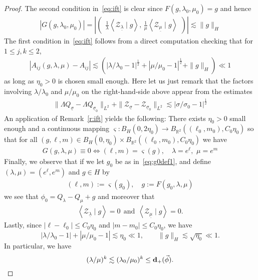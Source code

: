\documentclass[10pt,reqno]{amsart}
\newcommand{\ZZ}{\mathcal{Z}}
\newcommand{\R}{\mathbb{R}}
\newcommand{\la}{\lambda}
\newcommand{\s}{\sigma}
\newcommand{\si}{\varsigma}
\newcommand{\La}{\Lambda}
\newcommand{\U}{\underline}
\newcommand{\ang}[1]{\left\langle{#1}\right\rangle}
\newcommand{\abs}[1]{\left\lvert{#1}\right\rvert}
\newcommand{\EQ}[1]{\begin{equation}\begin{split} #1 \end{split}\end{equation}}
\newcommand{\pmat}[1]{\begin{pmatrix} #1 \end{pmatrix}}
\numberwithin{equation}{section}
\theoremstyle{remark}
\newcommand{\mand}{{\ \ \text{and} \ \  }}
\newcommand{\ula}{\underline{\lambda}}
\newcommand{\umu}{\underline{\mu}}
\newcommand{\0}{\emptyset}
\newcommand{\bfd}{{\bf d}}
\begin{document}
\begin{proof}
The second condition in~\eqref{eq:ift} is clear since $F(g, \la_0, \mu_0) = g$ and hence
\EQ{
| G( g, \la_0, \mu_0)| = \abs{  \pmat{ \frac{1}{\la} \ang{ \ZZ_{\ula} \mid g} , \, \frac{1}{\mu} \ang{ \ZZ_{\U\mu}  \mid g} }} \lesssim   \| g\|_H
}
The first condition in~\eqref{eq:ift} follows from a direct computation checking that for $1 \le j, k \le2$, 
\EQ{
\abs{  A_{ij}(g, \la, \mu) - A_{ij} } \lesssim ( \abs{ \la/\la_0 - 1}^{\frac{1}{2}} + \abs{\mu/ \mu_0 -1}^{\frac{1}{2}} + \|g \|_H)   \ll 1 
} 
as long as $\eta_0>0$ is chosen small enough. Here let us just remark that the factors involving $\la/\la_0$ and $\mu/\mu_0$ on the right-hand-side above appear from the estimates 
\EQ{
 \| \La Q_{\U \s} - \La Q_{\U \s_0} \|_{L^2} + \| \ZZ_{\U \s} - \ZZ_{\U \s_0} \|_{L^2} \lesssim \abs{\s/ \s_0 - 1}^{\frac{1}{2}}
}
An application of Remark~\ref{r:ift}  yields the following: There exists $\eta_0>0$ small enough %
 and a continuous mapping $\si: B_{H}(0, 2\eta_0) \to B_{\R^2}((\ell_0, m_0), C_0 \eta_0)$
 so that for all $(g, \ell, m) \in B_{H}(0, \eta_0) \times B_{\R^2}( (\ell_0, m_0), C_0 \eta_0)$ we have 
\EQ{
G( g, \la, \mu) \equiv 0 \Longleftrightarrow  (\ell, m) = \si(g), \quad \la = e^\ell, \, \, \mu = e^m
}
Finally, we observe that if we let $ g_0$ be as in~\eqref{eq:g0def1}, and define $(\la, \mu) = (e^{\ell}, e^{m})$ and $ g \in H$ by 
\EQ{
(\ell, m):=  \si( g_0), \quad g:= F(  g_0, \la, \mu)
}
we see that $ \phi_0 = Q_{\la} - Q_{\mu} + g$ and moreover that 
\EQ{
\ang{ \ZZ_{\ula}  \mid g} = 0 \mand \ang{ \ZZ_{\umu} \mid g} = 0. 
}
Lastly, since $\abs{\ell - \ell_0} \le C_0 \eta_0$ and $\abs{m - m_0} \le C_0 \eta_0$, we have
\begin{equation}
\label{eq:g-small-666}
\abs{\lambda/\lambda_0 - 1} + \abs{\mu/\mu_0 - 1} \lesssim \eta_0 \ll 1,\qquad \|g\|_H \lesssim \sqrt{\eta_0} \ll 1.
\end{equation}
In particular, we have
\begin{equation}
\label{eq:g-small-6666}
(\lambda/\mu)^k \lesssim (\lambda_0/\mu_0)^k  \leq \bfd_+(\vec \phi).
\end{equation}


\end{proof}
\end{document}
